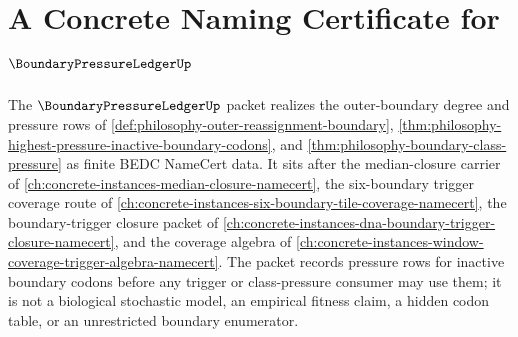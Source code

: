 \chapter{A Concrete Naming Certificate for $\BoundaryPressureLedgerUp$}
\label{ch:concrete-instances-boundary-pressure-ledger-namecert}

The $\BoundaryPressureLedgerUp$ packet realizes the outer-boundary degree and pressure rows of \autoref{def:philosophy-outer-reassignment-boundary}, \autoref{thm:philosophy-highest-pressure-inactive-boundary-codons}, and \autoref{thm:philosophy-boundary-class-pressure} as finite BEDC NameCert data. It sits after the median-closure carrier of \autoref{ch:concrete-instances-median-closure-namecert}, the six-boundary trigger coverage route of \autoref{ch:concrete-instances-six-boundary-tile-coverage-namecert}, the boundary-trigger closure packet of \autoref{ch:concrete-instances-dna-boundary-trigger-closure-namecert}, and the coverage algebra of \autoref{ch:concrete-instances-window-coverage-trigger-algebra-namecert}. The packet records pressure rows for inactive boundary codons before any trigger or class-pressure consumer may use them; it is not a biological stochastic model, an empirical fitness claim, a hidden codon table, or an unrestricted boundary enumerator.

